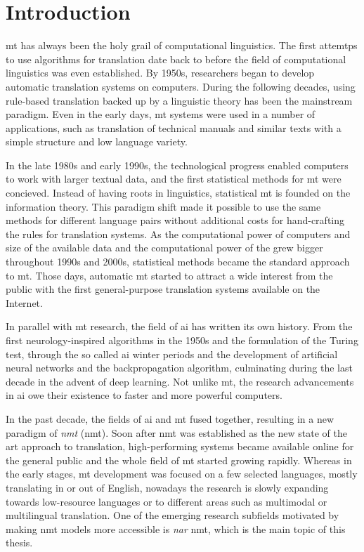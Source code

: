 \chapter{Introduction}%
\label{chap:intro}

\Ac{mt} has always been the holy grail of computational linguistics. The first
attemtps to use algorithms for translation date back to before the field of
computational linguistics was even established. By 1950s, researchers began to
develop automatic translation systems on computers. During the following
decades, using rule-based translation backed up by a linguistic theory has been
the mainstream paradigm. Even in the early days, \ac{mt} systems were used in a
number of applications, such as translation of technical manuals and similar
texts with a simple structure and low language variety.

In the late 1980s and early 1990s, the technological progress enabled computers
to work with larger textual data, and the first statistical methods for \ac{mt}
were concieved. Instead of having roots in linguistics, statistical \ac{mt} is
founded on the information theory. This paradigm shift made it possible to use
the same methods for different language pairs without additional costs for
hand-crafting the rules for translation systems. As the computational power of
computers and size of the available data and the computational power of the
grew bigger throughout 1990s and 2000s, statistical methods became the standard
approach to \ac{mt}. Those days, automatic \ac{mt} started to attract a wide
interest from the public with the first general-purpose translation systems
available on the Internet.

In parallel with \ac{mt} research, the field of \ac{ai} has written its own
history. From the first neurology-inspired algorithms in the 1950s and the
formulation of the Turing test, through the so called \ac{ai} winter periods
and the development of artificial neural networks and the backpropagation
algorithm, culminating during the last decade in the advent of deep learning.
Not unlike \ac{mt}, the research advancements in \ac{ai} owe their existence to
faster and more powerful computers.

In the past decade, the fields of \ac{ai} and \ac{mt} fused together, resulting
in a new paradigm of \emph{\acl{nmt}} (\acs{nmt}). Soon after
\ac{nmt} was established as the new state of the art approach to translation,
high-performing systems became available online for the general public and the
whole field of \ac{mt} started growing rapidly. Whereas in the early stages,
\ac{mt} development was focused on a few selected languages, mostly translating
in or out of English, nowadays the research is slowly expanding towards
low-resource languages or to different areas such as multimodal or multilingual
translation. One of the emerging research subfields motivated by making
\ac{nmt} models more accessible is \emph{\acl{nar}} \ac{nmt}, which is the main
topic of this thesis.

